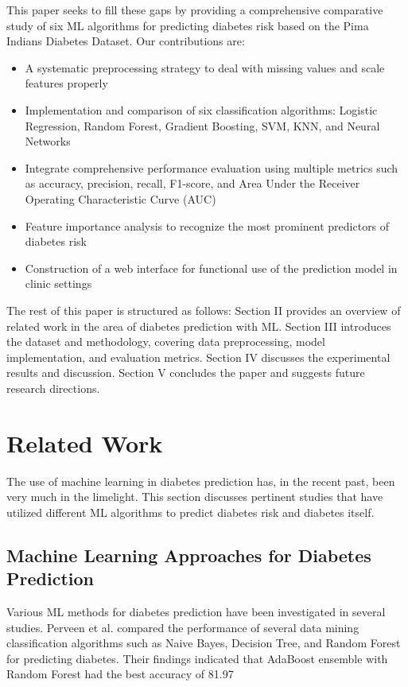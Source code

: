\documentclass[conference]{IEEEtran}
\begin{document}
This paper seeks to fill these gaps by providing a comprehensive comparative study of six ML algorithms for predicting diabetes risk based on the Pima Indians Diabetes Dataset. Our contributions are:

\begin{itemize}
    \item A systematic preprocessing strategy to deal with missing values and scale features properly
    \item Implementation and comparison of six classification algorithms: Logistic Regression, Random Forest, Gradient Boosting, SVM, KNN, and Neural Networks
\item Integrate comprehensive performance evaluation using multiple metrics such as accuracy, precision, recall, F1-score, and Area Under the Receiver Operating Characteristic Curve (AUC)
    \item Feature importance analysis to recognize the most prominent predictors of diabetes risk
    \item Construction of a web interface for functional use of the prediction model in clinic settings
\end{itemize}

The rest of this paper is structured as follows: Section II provides an overview of related work in the area of diabetes prediction with ML. Section III introduces the dataset and methodology, covering data preprocessing, model implementation, and evaluation metrics. Section IV discusses the experimental results and discussion. Section V concludes the paper and suggests future research directions.

\section{Related Work}
The use of machine learning in diabetes prediction has, in the recent past, been very much in the limelight. This section discusses pertinent studies that have utilized different ML algorithms to predict diabetes risk and diabetes itself.

\subsection{Machine Learning Approaches for Diabetes Prediction}
Various ML methods for diabetes prediction have been investigated in several studies. Perveen et al. \cite{perveen2016} compared the performance of several data mining classification algorithms such as Naive Bayes, Decision Tree, and Random Forest for predicting diabetes. Their findings indicated that AdaBoost ensemble with Random Forest had the best accuracy of 81.97%
\end{document}
